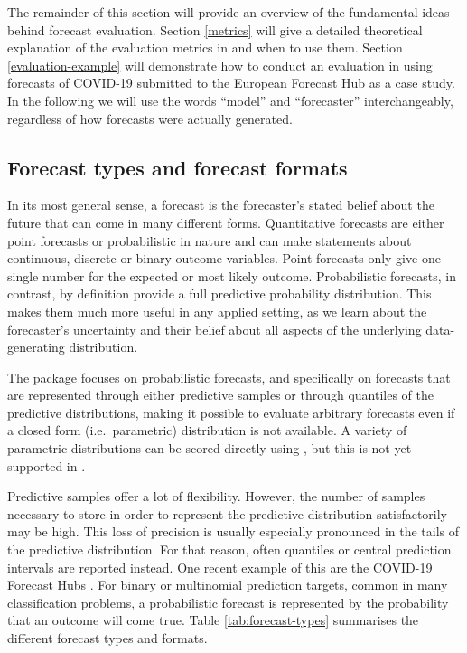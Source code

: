 \documentclass[
]{jss}
\begin{document}
The remainder of this section will provide an overview of the
fundamental ideas behind forecast evaluation. Section \ref{metrics} will
give a detailed theoretical explanation of the evaluation metrics in
 and when to use them. Section
\ref{evaluation-example} will demonstrate how to conduct an evaluation
in  using forecasts of COVID-19 submitted to the
European Forecast Hub
\citep{europeancovid-19forecasthubEuropeanCovid19Forecast2021} as a case
study. In the following we will use the words ``model'' and
``forecaster'' interchangeably, regardless of how forecasts were
actually generated.

\hypertarget{forecast-types-and-forecast-formats}{%
\subsection{Forecast types and forecast
formats}\label{forecast-types-and-forecast-formats}}

In its most general sense, a forecast is the forecaster's stated belief
about the future \citep{gneitingStrictlyProperScoring2007} that can come
in many different forms. Quantitative forecasts are either point
forecasts or probabilistic in nature and can make statements about
continuous, discrete or binary outcome variables. Point forecasts only
give one single number for the expected or most likely outcome.
Probabilistic forecasts, in contrast, by definition provide a full
predictive probability distribution. This makes them much more useful in
any applied setting, as we learn about the forecaster's uncertainty and
their belief about all aspects of the underlying data-generating
distribution.

The  package focuses on probabilistic forecasts, and
specifically on forecasts that are represented through either predictive
samples or through quantiles of the predictive distributions, making it
possible to evaluate arbitrary forecasts even if a closed form
(i.e.~parametric) distribution is not available. A variety of parametric
distributions can be scored directly using , but this
is not yet supported in .

Predictive samples offer a lot of flexibility. However, the number of
samples necessary to store in order to represent the predictive
distribution satisfactorily may be high. This loss of precision is
usually especially pronounced in the tails of the predictive
distribution. For that reason, often quantiles or central prediction
intervals are reported instead. One recent example of this are the
COVID-19 Forecast Hubs
\citep{cramerCOVID19ForecastHub2020, cramerEvaluationIndividualEnsemble2021, bracherShorttermForecastingCOVID192021, bracherNationalSubnationalShortterm2021, europeancovid-19forecasthubEuropeanCovid19Forecast2021}.
For binary or multinomial prediction targets, common in many
classification problems, a probabilistic forecast is represented by the
probability that an outcome will come true. Table
\ref{tab:forecast-types} summarises the different forecast types and
formats.
\end{document}

